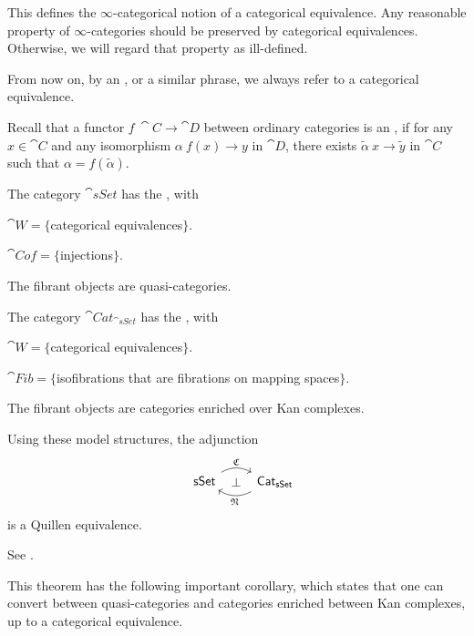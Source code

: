 \begin{remark}
    This defines the $\infty$-categorical notion
    of a categorical equivalence.
    Any reasonable property of $\infty$-categories
    should be preserved by categorical equivalences.
    Otherwise, we will regard that property as ill-defined.
    \varqed
\end{remark}

From now on, by an ,
or a similar phrase, we always refer to a categorical equivalence.

Recall that a functor $f\:\cat C\to\cat D$ between ordinary categories is an ,
if for any $x\in\cat C$ and any isomorphism $\alpha\:f(x)\to y$ in $\cat D$,
there exists $\tilde\alpha\:x\to\tilde y$ in $\cat C$ such that $\alpha=f(\tilde\alpha)$.

\begin{theorem}\label{thm-4-e}
    The category $\cat{sSet}$ has the , with 
    \begin{itms}
        \item $\cat W=\{$categorical equivalences$\}$.
        \item $\cat{Cof}=\{$injections$\}$.
        \item The fibrant objects are quasi-categories.
    \end{itms}
    The category $\cat{Cat}_{\cat{sSet}}$ has the , with
    \begin{itms}
        \item $\cat W=\{$categorical equivalences$\}$.
        \item $\cat{Fib}=\{$isofibrations that are fibrations on mapping spaces$\}$.
        \item The fibrant objects are categories enriched over Kan complexes.
    \end{itms}
    Using these model structures, the adjunction
    \[\begin{tikzcd}
        \cat{sSet}\ar[r,bend left,"\mathfrak C"]\ar[r,phantom,"\bot"] &
        \rlap{$\cat{Cat}_{\cat{sSet}}$}\phantom{\cat{sSet}}\ar[l,bend left,"\mathfrak N"]
    \end{tikzcd}\]
    is a Quillen equivalence.
\end{theorem}

See \cite[Theorem~2.2.5.1]{htt}.

This theorem has the following important corollary,
which states that one can convert between quasi-categories 
and categories enriched between Kan complexes, up to 
a categorical equivalence.

